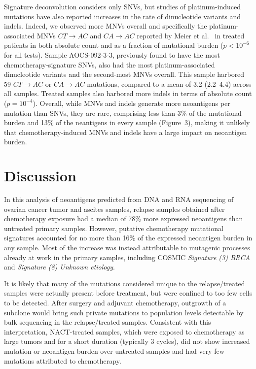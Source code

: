\documentclass[linenumbers]{bmcart}
\begin{document}
Signature deconvolution considers only SNVs, but studies of platinum-induced mutations have also reported increases in the rate of dinucleotide variants and indels. Indeed, we observed more MNVs overall and specifically the platinum-associated MNVs $CT \rightarrow AC$ and $CA \rightarrow AC$ reported by Meier et al.~\cite{Meier_2014} in treated patients in both absolute count and as a fraction of mutational burden ($p < 10^{-6}$ for all tests). Sample AOCS-092-3-3, previously found to have the most chemotherapy-signature SNVs, also had the most platinum-associated dinucleotide variants and the second-most MNVs overall. This sample harbored 59 $CT \rightarrow AC$ or $CA \rightarrow AC$ mutations, compared to a mean of 3.2 (2.2--4.4) across all samples. Treated samples also harbored more indels in terms of absolute count ($p=10^{-4}$). Overall, while MNVs and indels generate more neoantigens per mutation than SNVs, they are rare, comprising less than 3\% of the mutational burden and 13\% of the neantigens in every sample (Figure~3), making it unlikely that chemotherapy-induced MNVs and indels have a large impact on neoantigen burden.


\section*{Discussion}
In this analysis of neoantigens predicted from DNA and RNA sequencing of ovarian cancer tumor and ascites samples, relapse samples obtained after chemotherapy exposure had a median of 78\% more expressed neoantigens than untreated primary samples. However, putative chemotherapy mutational signatures accounted for no more than 16\% of the expressed neoantigen burden in any sample. Most of the increase was instead attributable to mutagenic processes already at work in the primary samples, including COSMIC \textit{Signature (3) BRCA} and \textit{Signature (8) Unknown etiology}. 


It is likely that many of the mutations considered unique to the relapse/treated samples were actually present before treatment, but were confined to too few cells to be detected. After surgery and adjuvant chemotherapy, outgrowth of a subclone would bring such private mutations to population levels detectable by bulk sequencing in the relapse/treated samples. Consistent with this interpretation, NACT-treated samples, which were exposed to chemotherapy as large tumors and for a short duration (typically 3 cycles), did not show increased mutation or neoantigen burden over untreated samples and had very few mutations attributed to chemotherapy.
\end{document}
